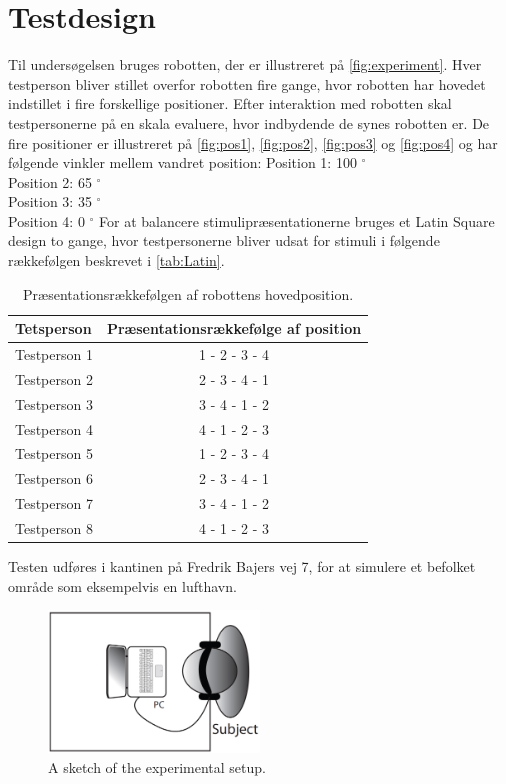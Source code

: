 \section*{Testdesign}
%
Til undersøgelsen bruges robotten, der er illustreret på \autoref{fig:experiment}. Hver testperson bliver stillet overfor robotten fire gange, hvor robotten har hovedet indstillet i fire forskellige positioner. Efter interaktion med robotten skal testpersonerne på en skala evaluere, hvor indbydende de synes robotten er. De fire positioner er illustreret på \autoref{fig:pos1}, \autoref{fig:pos2}, \autoref{fig:pos3} og \autoref{fig:pos4} og har følgende vinkler mellem vandret position:\blankline
%
Position 1: 100 $^{\circ}$\\
Position 2: 65 $^{\circ}$\\
Position 3: 35 $^{\circ}$\\
Position 4: 0 $^{\circ}$\blankline
%
For at balancere stimulipræsentationerne bruges et Latin Square design to gange, hvor testpersonerne bliver udsat for stimuli i følgende rækkefølgen beskrevet i \autoref{tab:Latin}.\blankline
%
\begin{table}[H]
	\centering
	\begin{tabular}{l|c}
		Tetsperson     & Præsentationsrækkefølge af position \\\hline
		Testperson 1   & 1 - 2 - 3 - 4          \\\hline
		Testperson 2   & 2 - 3 - 4 - 1          \\\hline
		Testperson 3   & 3 - 4 - 1 - 2          \\\hline
		Testperson 4   & 4 - 1 - 2 - 3          \\\hline
		Testperson 5   & 1 - 2 - 3 - 4          \\\hline
		Testperson 6   & 2 - 3 - 4 - 1          \\\hline
		Testperson 7   & 3 - 4 - 1 - 2          \\\hline
		Testperson 8   & 4 - 1 - 2 - 3   
	\end{tabular}
	\caption{Præsentationsrækkefølgen af robottens hovedposition.}
	\label{tab:Latin}         
\end{table}
\noindent
%
Testen udføres i kantinen på Fredrik Bajers vej 7, for at simulere et befolket område som eksempelvis en lufthavn. 



%
\begin{figure}[H]
\centering
\includegraphics[width = 0.5\textwidth]{Figure/experiment.png} 
\caption{A sketch of the experimental setup.}
\label{fig:experiment}
\end{figure}
%
